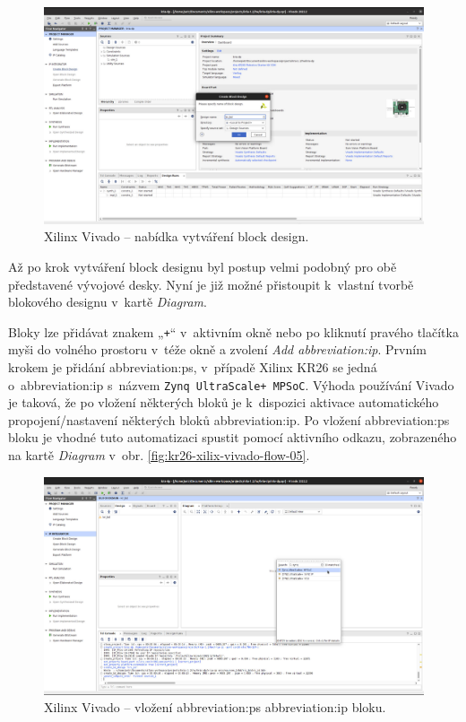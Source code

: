 \documentclass[a4paper, twoside, 11pt]{article}
\begin{document}
				\begin{figure}[htbp!]
					\centering
					\includegraphics[width=1\textwidth]{src/png/kr26-xilinx-vivado-flow/kr26-xilix-vivado-flow-03.jpg}
					\caption{Xilinx Vivado – nabídka vytváření block design.}
					\label{fig:kr26-xilix-vivado-flow-03}
				\end{figure}

				Až po krok vytváření block designu byl postup velmi podobný pro obě představené vývojové desky. Nyní je již možné přistoupit k~vlastní tvorbě blokového designu v~kartě \textit{Diagram}.\par
				Bloky lze přidávat znakem „\texttt{+}“ v~aktivním okně nebo po kliknutí pravého tlačítka myši do volného prostoru v~téže okně a zvolení \textit{Add \gls{abbreviation:ip}}. Prvním krokem je přidání \gls{abbreviation:ps}, v~případě Xilinx KR26 se jedná o~\gls{abbreviation:ip} s~názvem \texttt{Zynq UltraScale+ MPSoC}. Výhoda používání Vivado je taková, že po vložení některých bloků je k~dispozici aktivace automatického propojení/nastavení některých bloků \gls{abbreviation:ip}. Po vložení \gls{abbreviation:ps} bloku je vhodné tuto automatizaci spustit pomocí aktivního odkazu, zobrazeného na kartě \textit{Diagram} v~obr. \ref{fig:kr26-xilix-vivado-flow-05}.

				\begin{figure}[htbp!]
					\centering
					\includegraphics[width=1\textwidth]{src/png/kr26-xilinx-vivado-flow/kr26-xilix-vivado-flow-04.jpg}
					\caption{Xilinx Vivado – vložení \gls{abbreviation:ps} \gls{abbreviation:ip} bloku.}
					\label{fig:kr26-xilix-vivado-flow-04}
				\end{figure}
\end{document}
